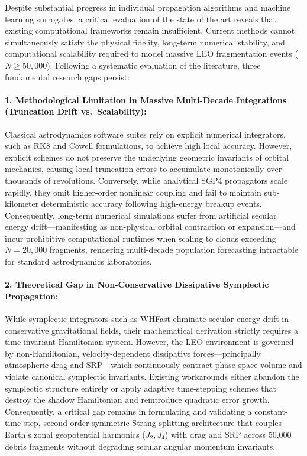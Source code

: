 Despite substantial progress in individual propagation algorithms and machine learning surrogates, a critical evaluation of the state of the art reveals that existing computational frameworks remain insufficient. Current methods cannot simultaneously satisfy the physical fidelity, long-term numerical stability, and computational scalability required to model massive LEO fragmentation events ($N \ge 50,000$). Following a systematic evaluation of the literature, three fundamental research gaps persist:

\paragraph{1. Methodological Limitation in Massive Multi-Decade Integrations (Truncation Drift vs.\ Scalability):}
Classical astrodynamics software suites rely on explicit numerical integrators, such as RK8 and Cowell formulations, to achieve high local accuracy. However, explicit schemes do not preserve the underlying geometric invariants of orbital mechanics, causing local truncation errors to accumulate monotonically over thousands of revolutions. Conversely, while analytical SGP4 propagators scale rapidly, they omit higher-order nonlinear coupling and fail to maintain sub-kilometer deterministic accuracy following high-energy breakup events. Consequently, long-term numerical simulations suffer from artificial secular energy drift---manifesting as non-physical orbital contraction or expansion---and incur prohibitive computational runtimes when scaling to clouds exceeding $N = 20,000$ fragments, rendering multi-decade population forecasting intractable for standard astrodynamics laboratories.

\paragraph{2. Theoretical Gap in Non-Conservative Dissipative Symplectic Propagation:}
While symplectic integrators such as WHFast \cite{rein_whfast_2015} eliminate secular energy drift in conservative gravitational fields, their mathematical derivation strictly requires a time-invariant Hamiltonian system. However, the LEO environment is governed by non-Hamiltonian, velocity-dependent dissipative forces---principally atmospheric drag and SRP---which continuously contract phase-space volume and violate canonical symplectic invariants. Existing workarounds either abandon the symplectic structure entirely or apply adaptive time-stepping schemes that destroy the shadow Hamiltonian and reintroduce quadratic error growth. Consequently, a critical gap remains in formulating and validating a constant-time-step, second-order symmetric Strang splitting architecture that couples Earth's zonal geopotential harmonics ($J_2, J_4$) with drag and SRP across 50,000 debris fragments without degrading secular angular momentum invariants.

